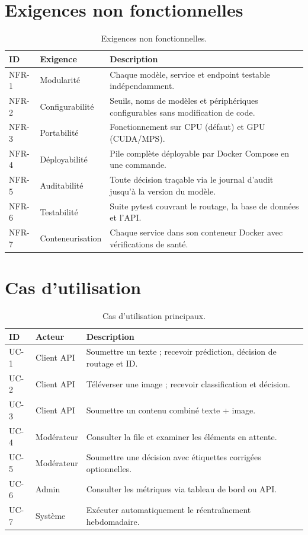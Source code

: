 \section{Exigences non fonctionnelles}

\begin{table}[H]
\centering
\caption{Exigences non fonctionnelles.}
\label{tab:nfr}
\begin{tabularx}{\textwidth}{llX}
\toprule
\textbf{ID} & \textbf{Exigence} & \textbf{Description} \\
\midrule
NFR-1 & Modularité & Chaque modèle, service et endpoint testable indépendamment. \\
NFR-2 & Configurabilité & Seuils, noms de modèles et périphériques configurables sans modification de code. \\
NFR-3 & Portabilité & Fonctionnement sur CPU (défaut) et GPU (CUDA/MPS). \\
NFR-4 & Déployabilité & Pile complète déployable par Docker Compose en une commande. \\
NFR-5 & Auditabilité & Toute décision traçable via le journal d'audit jusqu'à la version du modèle. \\
NFR-6 & Testabilité & Suite pytest couvrant le routage, la base de données et l'API. \\
NFR-7 & Conteneurisation & Chaque service dans son conteneur Docker avec vérifications de santé. \\
\bottomrule
\end{tabularx}
\end{table}

\section{Cas d'utilisation}

\begin{table}[H]
\centering
\caption{Cas d'utilisation principaux.}
\label{tab:use_cases}
\begin{tabularx}{\textwidth}{llX}
\toprule
\textbf{ID} & \textbf{Acteur} & \textbf{Description} \\
\midrule
UC-1 & Client API & Soumettre un texte ; recevoir prédiction, décision de routage et ID. \\
UC-2 & Client API & Téléverser une image ; recevoir classification et décision. \\
UC-3 & Client API & Soumettre un contenu combiné texte + image. \\
UC-4 & Modérateur & Consulter la file et examiner les éléments en attente. \\
UC-5 & Modérateur & Soumettre une décision avec étiquettes corrigées optionnelles. \\
UC-6 & Admin & Consulter les métriques via tableau de bord ou API. \\
UC-7 & Système & Exécuter automatiquement le réentraînement hebdomadaire. \\
\bottomrule
\end{tabularx}
\end{table}

